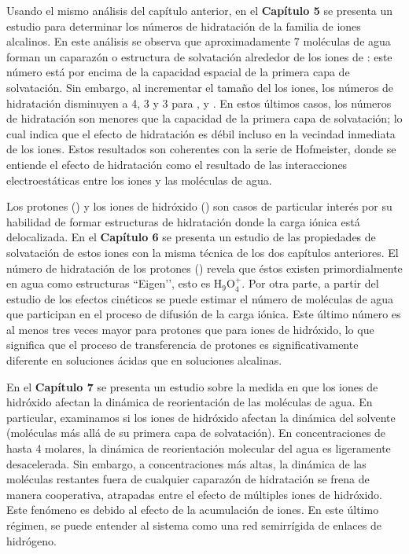 Usando el mismo an\'alisis del cap\'itulo anterior, en el \textbf{Cap\'itulo 5} se presenta un estudio para determinar los n\'umeros de hidrataci\'on de la familia de iones alcalinos. En este an\'alisis se observa que aproximadamente 7 mol\'eculas de agua forman un caparaz\'on o estructura de solvataci\'on alrededor de los iones de : este n\'umero est\'a por encima de la capacidad espacial de la primera capa de solvataci\'on. Sin embargo, al incrementar el tamaño del los iones, los n\'umeros de hidrataci\'on disminuyen a 4, 3 y 3 para ,  y . En estos \'ultimos casos, los n\'umeros de hidrataci\'on son menores que la capacidad de la primera capa de solvataci\'on; lo cual indica que el efecto de hidrataci\'on es d\'ebil incluso en la vecindad inmediata de los iones. Estos resultados son coherentes con la serie de Hofmeister, donde se entiende el efecto de hidrataci\'on como el resultado de las interacciones electroest\'aticas entre los iones y las mol\'eculas de agua.



Los protones () y los iones de hidr\'oxido () son casos de particular inter\'es por su habilidad de formar estructuras de hidrataci\'on donde la carga i\'onica est\'a delocalizada. En el \textbf{Cap\'itulo 6} se presenta un estudio de las propiedades de solvataci\'on de estos iones con la misma t\'ecnica de los dos cap\'itulos anteriores. El n\'umero de hidrataci\'on de los protones () revela que \'estos existen primordialmente en agua como estructuras ``Eigen’’, esto es H$_9$O$_4^+$. Por otra parte, a partir del estudio de los efectos cin\'eticos se puede estimar el n\'umero de mol\'eculas de agua que participan en el proceso de difusi\'on de la carga i\'onica. Este \'ultimo n\'umero es al menos tres veces mayor para protones que para iones de hidr\'oxido, lo que significa que el proceso de transferencia de protones es significativamente diferente en soluciones \'acidas que en soluciones alcalinas.



En el \textbf{Cap\'itulo 7} se presenta un estudio sobre la medida en que los iones de hidr\'oxido afectan la din\'amica de reorientaci\'on de las mol\'eculas de agua. En particular, examinamos si los iones de hidr\'oxido afectan la din\'amica del solvente (mol\'eculas m\'as all\'a de su primera capa de solvataci\'on). En concentraciones de hasta 4 molares, la din\'amica de reorientaci\'on molecular del agua es ligeramente desacelerada. Sin embargo, a concentraciones m\'as altas, la din\'amica de las mol\'eculas restantes fuera de cualquier caparaz\'on de hidrataci\'on se frena de manera cooperativa, atrapadas entre el efecto de m\'ultiples iones de hidr\'oxido. Este fen\'omeno es debido al efecto de la acumulaci\'on de iones. En este \'ultimo r\'egimen, se puede entender al sistema como una red semirr\'igida de enlaces de hidr\'ogeno. 



